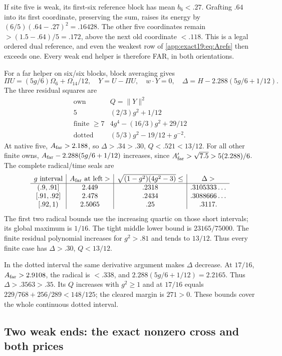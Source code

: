 \documentclass[11pt]{article}
\theoremstyle{definition}
\theoremstyle{remark}
\begin{document}
If site five is weak, its first-six
reference block has mean \(b_6<.27\).
Grafting \(.64\) into its first
coordinate, preserving the sum,
raises its energy by
\((6/5)(.64-.27)^2=.16428\).
The other five coordinates remain
\(>(1.5-.64)/5=.172\), above the
next old coordinate \(<.118\).
This is a legal ordered dual
reference, and even the weakest
row of \eqref{app:exact19:eq:Arefs}
then exceeds one.
Every weak end helper is therefore
FAR, in both orientations.

For a far helper on six/six blocks,
block averaging gives
\[
 \Pi U=(5g/6)\Omega_6+\Omega_{14}/12,\quad
 Y=U-\Pi U,\quad w\cdot Y=0,\quad
              \Delta=H-2.288(5g/6+1/12).
\]
The three residual squares are
\[
\begin{array}{c|c}
 \text{own}&Q=\|Y\|^2\\ \hline
 5&(2/3)g^2+1/12\\
 \text{finite }\ge7&4g^4-(16/3)g^2+29/12\\
 \text{dotted}&(5/3)g^2-19/12+g^{-2}.
\end{array}
\tag{A19Q}\label{app:exact19:eq:AhelperQ}
\]
At native five, \(A_{\rm far}>2.188\),
so \(\Delta>.34>.30\), \(Q<.521<13/12\).
For all other finite owns,
\(A_{\rm far}-2.288(5g/6+1/12)\)
increases, since
\(A_{\rm far}'>\sqrt{7.5}>5(2.288)/6\).
The complete radical/time seals are
\[
\begin{array}{c|c|c|c}
 g\text{ interval}&A_{\rm far}\text{ at left}>
      &\sqrt{(1-g^2)(4g^2-3)}\le&\Delta>\\ \hline
 (.9,.91]&2.449&.2318&.3105333\ldots\\
 {}[.91,.92]&2.478&.2434&.3088666\ldots\\
 {}[.92,1)&2.5065&.25&.3117 .
\end{array}
\]
The first two radical bounds use
the increasing quartic on those
short intervals; its global maximum
is \(1/16\).
The tight middle lower bound is
\(23165/75000\).
The finite residual polynomial
increases for \(g^2>.81\) and
tends to \(13/12\).
Thus every finite case has
\(\Delta>.30\), \(Q<13/12\).

In the dotted interval the same
derivative argument makes \(\Delta\)
decrease.
At \(17/16\), \(A_{\rm far}>2.9108\),
the radical is \(<.338\), and
\(2.288(5g/6+1/12)=2.2165\).
Thus \(\Delta>.3563>.35\).
Its \(Q\) increases with \(g^2\ge1\)
and at \(17/16\) equals
\(229/768+256/289<148/125\);
the cleared margin is \(271>0\).
These bounds cover the whole
continuous dotted interval.

\subsection{Two weak ends: the exact nonzero cross and both prices}
\label{app:exact19:Atwoweak}
\end{document}
